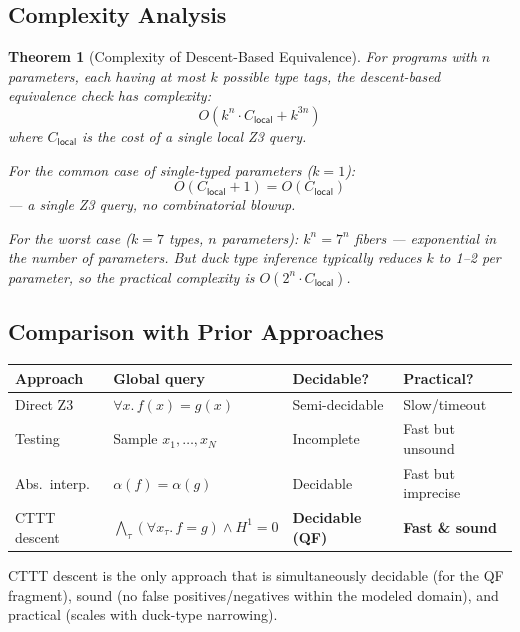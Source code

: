 \documentclass[11pt,a4paper]{report}
\theoremstyle{definition}
\theoremstyle{plain}
\newtheorem{theorem}[definition]{Theorem}
\newcommand{\Hone}{H^1}
\begin{document}
\subsection{Complexity Analysis}

\begin{theorem}[Complexity of Descent-Based Equivalence]
\label{thm:descent-complexity}
For programs with $n$ parameters, each having at most $k$ possible
type tags, the descent-based equivalence check has complexity:
\[
  O(k^n \cdot C_\mathsf{local} + k^{3n})
\]
where $C_\mathsf{local}$ is the cost of a single local Z3 query.

For the common case of single-typed parameters ($k = 1$):
\[
  O(C_\mathsf{local} + 1) = O(C_\mathsf{local})
\]
--- a single Z3 query, no combinatorial blowup.

For the worst case ($k = 7$ types, $n$ parameters):
$k^n = 7^n$ fibers --- exponential in the number of parameters.
But duck type inference typically reduces $k$ to 1--2 per parameter,
so the practical complexity is $O(2^n \cdot C_\mathsf{local})$.
\end{theorem}

\subsection{Comparison with Prior Approaches}

\begin{center}
\small
\begin{tabular}{l l l l}
  \textbf{Approach} & \textbf{Global query} & \textbf{Decidable?} &
  \textbf{Practical?} \\
  \hline
  Direct Z3 & $\forall x.\, f(x) = g(x)$ & Semi-decidable &
    Slow/timeout \\
  Testing & Sample $x_1, \ldots, x_N$ & Incomplete &
    Fast but unsound \\
  Abs.\ interp. & $\alpha(f) = \alpha(g)$ & Decidable &
    Fast but imprecise \\
  CTTT descent & $\bigwedge_\tau (\forall x_\tau.\, f = g) \land
    \Hone = 0$ & \textbf{Decidable (QF)} & \textbf{Fast \& sound} \\
\end{tabular}
\end{center}

CTTT descent is the only approach that is simultaneously decidable
(for the QF fragment), sound (no false positives/negatives within
the modeled domain), and practical (scales with duck-type narrowing).
\end{document}
